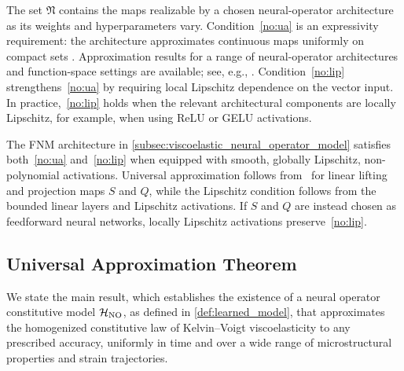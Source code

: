 \documentclass[3p, 12pt, preprint]{elsarticle}
\begin{document}
\begin{remark}[Architecture]\label{rmk:general_admissibility}
    The set $\mathfrak{N}$ contains the maps realizable by a chosen neural-operator architecture as its weights and hyperparameters vary. Condition~\ref{no:ua} is an expressivity requirement: the architecture approximates continuous maps uniformly on compact sets \cite{kovachki2023neural}. Approximation results for a range of neural-operator architectures and function-space settings are available; see, e.g., \cite{chen1995universal,bhattacharya2021pca,kovachki2021universal,nelsen2021random,luo2025dimension,lanthaler2025nonlocality}. Condition~\ref{no:lip} strengthens~\ref{no:ua} by requiring local Lipschitz dependence on the vector input. In practice,~\ref{no:lip} holds when the relevant architectural components are locally Lipschitz, for example, when using ReLU or GELU activations.
\end{remark}

\begin{remark}\label{rmk:fnm_admissible}
    The FNM architecture in \cref{subsec:viscoelastic_neural_operator_model} satisfies both~\ref{no:ua} and~\ref{no:lip} when equipped with smooth, globally Lipschitz, non-polynomial activations. Universal approximation follows from~\cite{huang2025operator} for linear lifting and projection maps $S$ and $Q$, while the Lipschitz condition follows from the bounded linear layers and Lipschitz activations. If $S$ and $Q$ are instead chosen as feedforward neural networks, locally Lipschitz activations preserve~\ref{no:lip}.
\end{remark}

\subsection{Universal Approximation Theorem}\label{subsec:ua_main_result}

We state the main result, which establishes the existence of a neural operator constitutive model ${\mathcal{H}}_{\rm NO}$, as defined in \cref{def:learned_model}, that approximates the homogenized constitutive law of Kelvin--Voigt viscoelasticity to any prescribed accuracy, uniformly in time and over a wide range of microstructural properties and strain trajectories.
\end{document}
